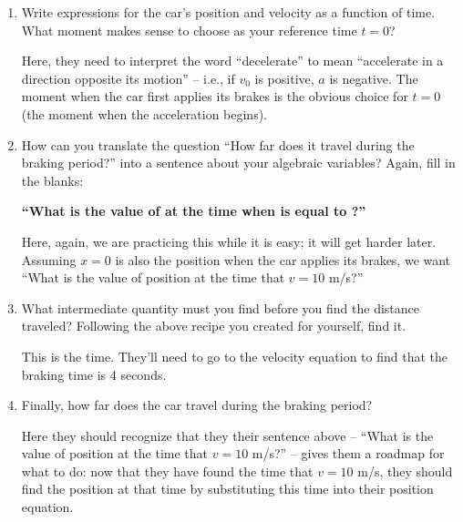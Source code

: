 \documentclass[12pt]{article}
\begin{document}
\begin{enumerate}
	\item Write expressions for the car's position and velocity as a function of time. What moment makes sense to choose as your reference time $t=0$?
	
	\vspace{1in}
{\color{Red} Here, they need to interpret the word ``decelerate'' to mean ``accelerate in a direction opposite its motion'' -- i.e., if $v_0$ is positive, $a$ is negative. The moment when the car first applies its brakes is the obvious choice for $t=0$ (the moment when the acceleration begins).}
	
	\item How can you translate the question ``How far does it travel during the braking period?'' into a sentence about your algebraic variables? Again, fill in the blanks: 
	
	\begin{center}
		{\bf ``What is the value of \underline{\hspace{0.7in}} at the time when \underline{\hspace{0.7in}} is equal to \underline{\hspace{0.7in}}?''} 
	\end{center}
	{\color{Red} Here, again, we are practicing this while it is easy; it will get harder later. Assuming $x=0$ is also the position when the car applies its brakes, we want ``What is the value of position at the time that $v=10$ m/s?''}
	
	\item What intermediate quantity must you find before you find the distance traveled? Following the above recipe you created for yourself, find it.
	
	{\color{Red} This is the time. They'll need to go to the velocity equation to find that the braking time is 4 seconds.}
	

	
	
	\vspace{2in}
	
	
	
	
	
	\item Finally, how far does the car travel during the braking period?
	
	{\color{Red}Here they should recognize that they their sentence above -- ``What is the value of position at the time that $v=10$ m/s?'' -- gives them a roadmap for what to do: now that they have found the time that $v=10$ m/s, they should find the position at that time by substituting this time into their position equation.
	
}
\end{enumerate}
\end{document}

